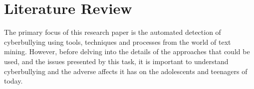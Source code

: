 
\chapter{Literature Review} %

\label{chapter3} %


The primary focus of this research paper is the automated detection of cyberbullying using tools, techniques and processes from the world of text mining. However, before delving into the details of the approaches that could be used, and the issues presented by this task, it is important to understand cyberbullying and the adverse affects it has on the adolescents and teenagers of today.